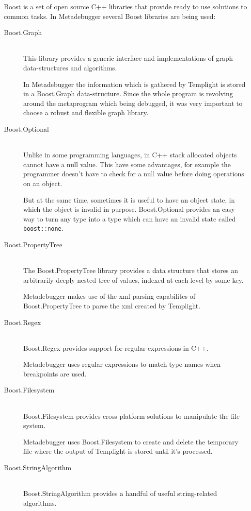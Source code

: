 Boost is a set of open source C++ libraries that provide ready to use solutions
to common tasks. In Metadebugger several Boost libraries are being used:
\begin{description}
    \item[Boost.Graph] \hfill \\
        This library provides a generic interface and implementations of graph
        data-structures and algorithms.

        In Metadebugger the information which is gathered by Templight is
        stored in a Boost.Graph data-structure. Since the whole program is
        revolving around the metaprogram which being debugged, it was very
        important to choose a robust and flexible graph library.
    \item[Boost.Optional] \hfill \\
        Unlike in some programming languages, in C++ stack allocated objects
        cannot have a null value. This have some advantages, for example the
        programmer doesn't have to check for a null value before doing
        operations on an object.

        But at the same time, sometimes it is useful to have an object state,
        in which the object is invalid in purpose. Boost.Optional provides an
        easy way to turn any type into a type which can have an invalid state
        called \verb|boost::none|.
    \item[Boost.PropertyTree] \hfill \\
        The Boost.PropertyTree library provides a data structure that stores an
        arbitrarily deeply nested tree of values, indexed at each level by some
        key.

        Metadebugger makes use of the xml parsing capabilites of
        Boost.PropertyTree to parse the xml created by Templight.
    \item[Boost.Regex] \hfill \\
        Boost.Regex provides support for regular expressions in C++.

        Metadebugger uses regular expressions to match type names when
        breakpoints are used.
    \item[Boost.Filesystem] \hfill \\
        Boost.Filesystem provides cross platform solutions to manipulate the
        file system.

        Metadebugger uses Boost.Filesystem to create and delete the temporary
        file where the output of Templight is stored until it's processed.
    \item[Boost.StringAlgorithm] \hfill \\
        Boost.StringAlgorithm provides a handful of useful string-related
        algorithms.


\end{description}
